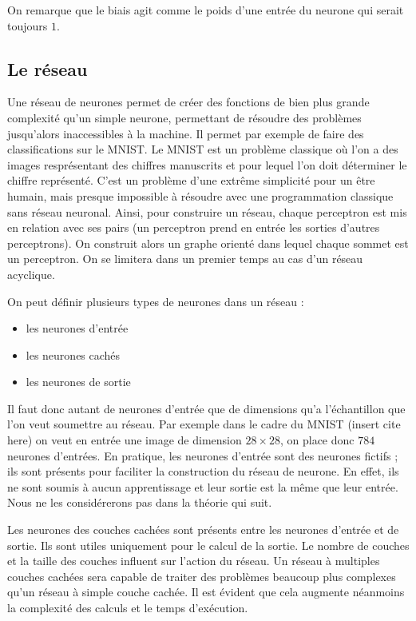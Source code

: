 \medskip

On remarque que le biais agit comme le poids d'une entrée du neurone qui serait
toujours $1$.

\subsection{Le réseau}

Une réseau de neurones permet de créer des fonctions de bien plus grande
complexité qu'un simple neurone, permettant de résoudre des problèmes
jusqu'alors inaccessibles à la machine. Il permet par exemple de faire des
classifications sur le MNIST. Le MNIST est un problème classique où l'on a des
images resprésentant des chiffres manuscrits et pour lequel l'on doit déterminer
 le chiffre représenté. C'est un problème d'une extrême simplicité pour un être
 humain, mais presque impossible à résoudre avec une programmation classique
sans réseau neuronal. Ainsi, pour construire un réseau, chaque perceptron est
mis en relation avec ses pairs (un perceptron prend en entrée les sorties
d'autres perceptrons). On construit alors un graphe orienté dans lequel chaque
sommet est un perceptron. On se limitera dans un premier temps au cas d'un
réseau acyclique.

\bigskip

On peut définir plusieurs types de neurones dans un réseau :
\begin{itemize}
\item les neurones d'entrée
\item les neurones cachés
\item les neurones de sortie
\end{itemize}

\bigskip

Il faut donc autant de neurones d'entrée que de dimensions qu'a l'échantillon
que l'on veut soumettre au réseau. Par exemple dans le cadre du MNIST (insert cite here)
on veut en entrée une image de dimension $28 \times 28$, on place donc $784$
neurones d'entrées. En pratique, les neurones d'entrée sont des neurones fictifs
 ; ils sont présents pour faciliter la construction du réseau de neurone.
En effet, ils ne sont soumis à aucun apprentissage et leur sortie est la même
que leur entrée. Nous ne les considérerons pas dans la théorie qui suit.

\medskip

Les neurones des couches cachées sont présents entre les neurones d'entrée et de
 sortie. Ils sont utiles uniquement pour le calcul de la sortie. Le nombre de
 couches et la taille des couches influent sur l'action du réseau. Un réseau à
 multiples couches cachées sera capable de traiter des problèmes beaucoup plus
 complexes qu'un réseau à simple couche cachée. Il est évident que cela augmente
  néanmoins la complexité des calculs et le temps d'exécution.

